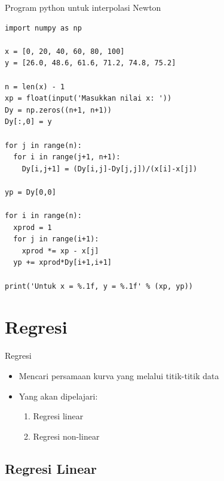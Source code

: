 \documentclass[pdflatex,compress,mathserif]{beamer}
\begin{document}
\begin{frame}[fragile]{Program python untuk interpolasi Newton}
	\begin{verbatim}
import numpy as np

x = [0, 20, 40, 60, 80, 100]
y = [26.0, 48.6, 61.6, 71.2, 74.8, 75.2]

n = len(x) - 1
xp = float(input('Masukkan nilai x: '))
Dy = np.zeros((n+1, n+1))
Dy[:,0] = y

for j in range(n):
  for i in range(j+1, n+1):
    Dy[i,j+1] = (Dy[i,j]-Dy[j,j])/(x[i]-x[j])
    
yp = Dy[0,0]

for i in range(n):
  xprod = 1
  for j in range(i+1):
    xprod *= xp - x[j]
  yp += xprod*Dy[i+1,i+1]
 
print('Untuk x = %.1f, y = %.1f' % (xp, yp))
	\end{verbatim}
\end{frame}

\section{Regresi}

\begin{frame}{Regresi}
	\begin{itemize}
		\item Mencari persamaan kurva yang melalui titik-titik data
		\item Yang akan dipelajari:
		\begin{enumerate}
			\item Regresi linear
			\item Regresi non-linear
		\end{enumerate}
	\end{itemize}
\end{frame}

\subsection{Regresi Linear}
\end{document}
